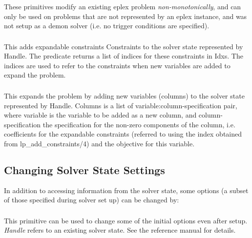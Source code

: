 These primitives modify an existing eplex problem {\it
non-monotonically}, and can only be used on problems that are not
represented by an eplex instance, and was not setup as a demon solver
(i.e. no trigger conditions are specified). 

\subsubsection{}
This adds expandable constraints Constraints to the solver state
represented by Handle. The predicate returns a list of indices for these
constraints in Idxs. The indices are used to refer to the constraints when
new variables are added to expand the problem.

\subsubsection{}
This expands the problem by adding new variables (columns) to the solver
state represented by Handle. Columns is a list of
variable:column-specification pair, where variable is the variable to be
added as a new column, and column-specification the specification for the
non-zero components of the column, i.e. coefficients for the expandable
constraints (referred to using the index obtained from
lp_add_constraints/4) and the objective for this variable.



\subsection{Changing Solver State Settings}
In addition to accessing information from the solver state, some options (a
subset of those specified during solver set up) can be changed by:
\subsubsection{}
This primitive can be used to change some of the initial options
even after setup. {\em Handle} refers to an existing solver state. See the
reference manual for details.

